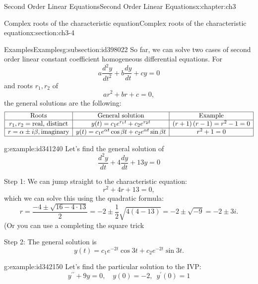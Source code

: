 \documentclass[oneside,10pt,]{book}
\numberwithin{equation}{section}
\numberwithin{equation}{section}
\newcommand{\amp}{&}
\begin{document}
\begin{chapterptx}{Second Order Linear Equations}{}{Second Order Linear Equations}{}{}{x:chapter:ch3}
\begin{sectionptx}{Complex roots of the characteristic equation}{}{Complex roots of the characteristic equation}{}{}{x:section:ch3-4}
%
\begin{subsectionptx}{Examples}{}{Examples}{}{}{g:subsection:id398022}
So far, we can solve two cases of second order linear constant coefficient homogeneous differential equations. For%
\begin{equation*}
a\frac{d^{2}y}{dt^{2}}+b\frac{dy}{dt}+cy=0
\end{equation*}
and roots \(r_1, r_2\) of%
\begin{equation*}
ar^{2}+br+c=0,
\end{equation*}
the general solutions are the following:%
\begin{equation*}
\begin{array}{|c|c|c|}
\hline
\text{Roots} \amp \text{General solution} \amp \text{Example}\\
\hline
r_{1},r_{2}= \text{real, distinct} \amp y(t)=c_{1}e^{r_{1}t}+c_{2}e^{r_{2}t} \amp \left(r+1\right)\left(r-1\right)=r^{2}-1=0\\
\hline
r=\alpha  \pm i\beta, \text{imaginary} \amp y(t)=c_{1}e^{\alpha  t}\cos \beta t+c_{2}e^{\alpha t}\sin \beta t \amp r^{2}+1=0\\
\hline
\end{array}
\end{equation*}
%
\begin{example}{}{g:example:id341240}%
Let's find the general solution of%
\begin{equation*}
\frac{d^{2}y}{dt}+4\frac{dy}{dt}+13y=0
\end{equation*}
%
\par
Step 1: We can jump straight to the characteristic equation:%
\begin{equation*}
r^{2}+4r+13=0,
\end{equation*}
which we can solve this using the quadratic formula:%
\begin{equation*}
r=\frac{-4\pm\sqrt{16-4\cdot13}}{2}=-2\pm\frac{1}{2}\sqrt{4(4-13)}=-2\pm\sqrt{-9}=-2\pm3i.
\end{equation*}
(Or you can use a completing the square trick%
\par
Step 2: The general solution is%
\begin{equation*}
y(t)=c_{1}e^{-2t}\cos3t+c_{2}e^{-2t}\sin3t.
\end{equation*}
%
\end{example}
\begin{example}{}{g:example:id342150}%
Let's find the particular solution to the IVP:%
\begin{equation*}
y^{\prime\prime}+9y=0,\,\,\,\,\,\,y(0)=-2,\,\,\,y^{\prime}(0)=1

\end{equation*}
\end{example}
\end{subsectionptx}
\end{sectionptx}
\end{chapterptx}
\end{document}
